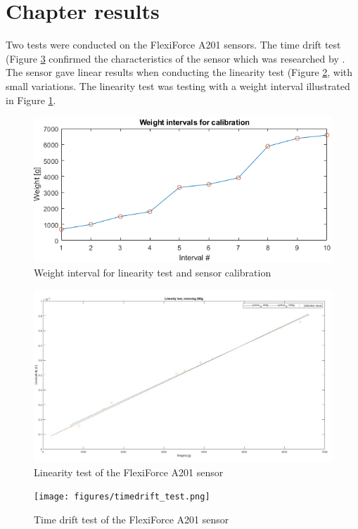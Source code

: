 \section{Chapter results}
Two tests were conducted on the FlexiForce A201 sensors. The time drift test (Figure \ref{fig:timedrifttest} confirmed the characteristics of the sensor which was researched by \cite{vecchi_experimental_2000}.
The sensor gave linear results when conducting the linearity test (Figure \ref{fig:linearitytest}, with small variations. The linearity test was testing with a weight interval illustrated in Figure \ref{fig:weightinterval}.

\begin{figure}
    \centering
    \includegraphics[width=1\textwidth]{figures/weight_interval2.png}
    \caption{Weight interval for linearity test and sensor calibration}
    \label{fig:weightinterval}
\end{figure}
\begin{figure}
    \centering
     \includegraphics[width=1\textwidth]{figures/comp_sensor2.jpg}
     \caption{Linearity test of the FlexiForce A201 sensor}
     \label{fig:linearitytest}
\end{figure}
\begin{figure}
    \centering
     \texttt{[image: figures/timedrift\_test.png]}
     \caption{Time drift test of the FlexiForce A201 sensor}
     \label{fig:timedrifttest}
\end{figure}

